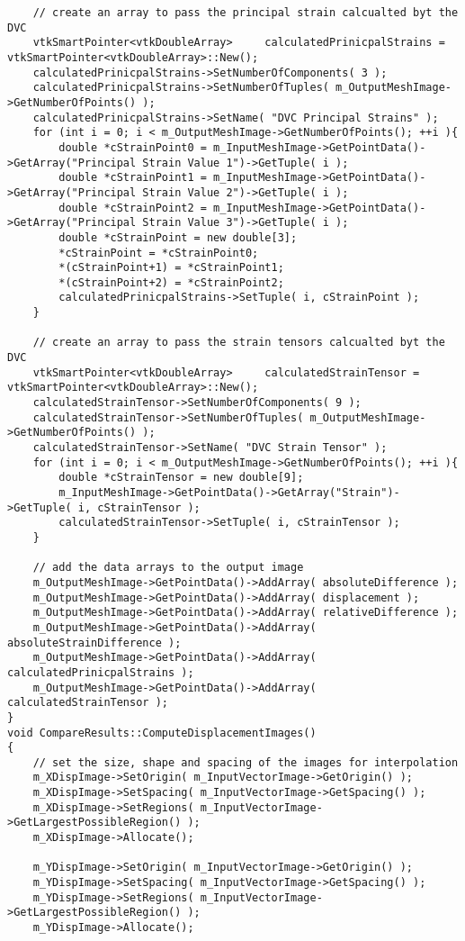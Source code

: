 \begin{lstlisting}
	// create an array to pass the principal strain calcualted byt the DVC
	vtkSmartPointer<vtkDoubleArray>		calculatedPrinicpalStrains = vtkSmartPointer<vtkDoubleArray>::New();
	calculatedPrinicpalStrains->SetNumberOfComponents( 3 );
	calculatedPrinicpalStrains->SetNumberOfTuples( m_OutputMeshImage->GetNumberOfPoints() );
	calculatedPrinicpalStrains->SetName( "DVC Principal Strains" );
	for (int i = 0; i < m_OutputMeshImage->GetNumberOfPoints(); ++i ){
		double *cStrainPoint0 = m_InputMeshImage->GetPointData()->GetArray("Principal Strain Value 1")->GetTuple( i );
		double *cStrainPoint1 = m_InputMeshImage->GetPointData()->GetArray("Principal Strain Value 2")->GetTuple( i );
		double *cStrainPoint2 = m_InputMeshImage->GetPointData()->GetArray("Principal Strain Value 3")->GetTuple( i );
		double *cStrainPoint = new double[3];
		*cStrainPoint = *cStrainPoint0;
		*(cStrainPoint+1) = *cStrainPoint1;
		*(cStrainPoint+2) = *cStrainPoint2;
		calculatedPrinicpalStrains->SetTuple( i, cStrainPoint );
	}

	// create an array to pass the strain tensors calcualted byt the DVC
	vtkSmartPointer<vtkDoubleArray>		calculatedStrainTensor = vtkSmartPointer<vtkDoubleArray>::New();
	calculatedStrainTensor->SetNumberOfComponents( 9 );
	calculatedStrainTensor->SetNumberOfTuples( m_OutputMeshImage->GetNumberOfPoints() );
	calculatedStrainTensor->SetName( "DVC Strain Tensor" );
	for (int i = 0; i < m_OutputMeshImage->GetNumberOfPoints(); ++i ){	
		double *cStrainTensor = new double[9];
		m_InputMeshImage->GetPointData()->GetArray("Strain")->GetTuple( i, cStrainTensor );
		calculatedStrainTensor->SetTuple( i, cStrainTensor );
	}

	// add the data arrays to the output image
	m_OutputMeshImage->GetPointData()->AddArray( absoluteDifference );
	m_OutputMeshImage->GetPointData()->AddArray( displacement );
	m_OutputMeshImage->GetPointData()->AddArray( relativeDifference );
	m_OutputMeshImage->GetPointData()->AddArray( absoluteStrainDifference );
	m_OutputMeshImage->GetPointData()->AddArray( calculatedPrinicpalStrains );
	m_OutputMeshImage->GetPointData()->AddArray( calculatedStrainTensor );
}
void CompareResults::ComputeDisplacementImages()
{
	// set the size, shape and spacing of the images for interpolation
	m_XDispImage->SetOrigin( m_InputVectorImage->GetOrigin() );
	m_XDispImage->SetSpacing( m_InputVectorImage->GetSpacing() );
	m_XDispImage->SetRegions( m_InputVectorImage->GetLargestPossibleRegion() );
	m_XDispImage->Allocate();
	
	m_YDispImage->SetOrigin( m_InputVectorImage->GetOrigin() );
	m_YDispImage->SetSpacing( m_InputVectorImage->GetSpacing() );
	m_YDispImage->SetRegions( m_InputVectorImage->GetLargestPossibleRegion() );
	m_YDispImage->Allocate();
	

\end{lstlisting}
